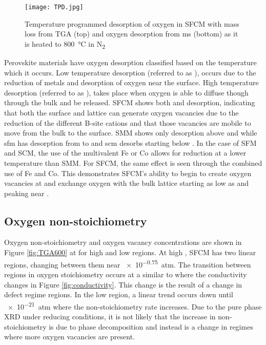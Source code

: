     \begin{figure}
      \texttt{[image: TPD.jpg]}
      \caption{Temperature programmed desorption of oxygen in SFCM with mass loss from TGA (top) and oxygen desorption from \gls{ms} (bottom) as it is heated to \SI{800}{\celsius} in N\textsubscript{2}}
      \label{fig:TPD}
    \end{figure}

    Perovskite materials have oxygen desorption classified based on the temperature which it occurs.
    Low temperature desorption (referred to as \textalpha{}), occurs due to the reduction of metals and desorption of oxygen near the surface.
    High temperature desorption (referred to as \textbeta{}), takes place when oxygen is able to diffuse though through the bulk and be released.\cite{Levasseur2009}
    SFCM shows both \textalpha{} and \textbeta{} desorption, indicating that both the surface and lattice can generate oxygen vacancies due to the reduction of the different B-site cations and that those vacancies are mobile to move from the bulk to the surface.
    SMM shows only \textbeta{} desorption above  and while \gls{sfm} has \textalpha{} desorption from  to  and \gls{scm} desorbs starting below .\cite{Liu2011, Vasala2010}
    In the case of SFM and SCM, the use of the multivalent Fe or Co allows for reduction at a lower temperature than SMM.
    For SFCM, the same effect is seen through the combined use of Fe and Co.
    This demonstrates SFCM's ability to begin to create oxygen vacancies at  and exchange oxygen with the bulk lattice starting as low as  and peaking near .

    \subsection{Oxygen non-stoichiometry}
    Oxygen non-stoichiometry and oxygen vacancy concentrations are shown in Figure \ref{fig:TGA600} at  for high and low  regions.
    At high , SFCM has two linear regions, changing between them near \SI{e-0.75}{atm}.
    The transition between regions in oxygen stoichiometry occurs at a similar  to where the conductivity changes in Figure \ref{fig:conductivity}.
    This change is the result of a change in defect regime regions.
    In the low  region, a linear trend occurs down until \SI{e-21}{atm} where the non-stoichiometry rate increases.
    Due to the pure phase XRD under reducing conditions, it is not likely that the increase in non-stoichiometry is due to phase decomposition and instead is a change in regimes where more oxygen vacancies are present.

